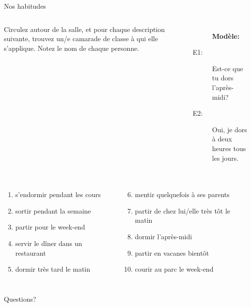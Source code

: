 \documentclass{beamer}
\begin{document}
  \begin{frame}{Nos habitudes}
    \begin{columns}
        Circulez autour de la salle, et pour chaque description suivante, trouvez un/e camarade de classe à qui elle s'applique.
        Notez le nom de chaque personne. \\
        \begin{description}
          \item[] \textbf{Modèle:}
          \item[E1:] Est-ce que tu dors l'après-midi?
          \item[] 
          \item[E2:] Oui, je dors à deux heures tous les jours.
          \item[] 
        \end{description}
    \end{columns}
    \vspace{0.5cm}
    \begin{columns}[t]
      \scriptsize
        \begin{enumerate}
          \item s'endormir pendant les cours
          \item sortir pendant la semaine
          \item partir pour le week-end
          \item servir le dîner dans un restaurant
          \item dormir très tard le matin
        \end{enumerate}
        \begin{enumerate}
          \setcounter{enumi}{5}
          \item mentir quelquefois à ses parents
          \item partir de chez lui/elle très tôt le matin
          \item dormir l'après-midi
          \item partir en vacanes bientôt
          \item courir au parc le week-end
        \end{enumerate}
    \end{columns}
  \end{frame}

  \begin{frame}{}
    \begin{center}
      \Large Questions?
    \end{center}
  \end{frame}
\end{document}
